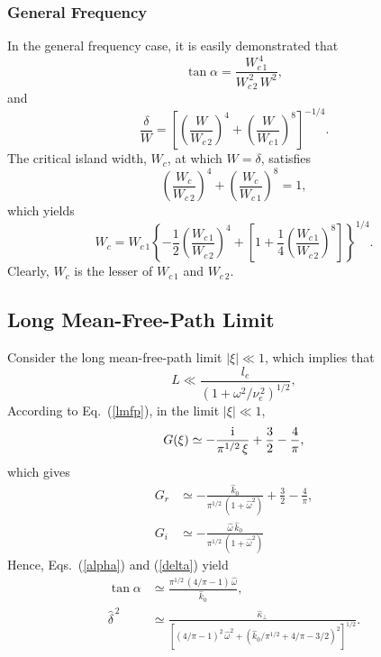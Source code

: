 \documentclass[12pt,prb,aps]{revtex4-1}
\begin{document}
\subsubsection{General Frequency}
In the general frequency case, it is easily demonstrated that
\begin{equation}
\tan\alpha  = \frac{W_{c\,1}^{\,4}}{W_{c\,2}^{\,2}\,W^2},
\end{equation}
and
\begin{equation}
\frac{\delta}{W} = \left[\left(\frac{W}{W_{c\,2}}\right)^4 + \left(\frac{W}{W_{c\,1}}\right)^8\right]^{-1/4}.
\end{equation}
The critical island width, $W_c$,  at which $W=\delta$, satisfies
\begin{equation}
\left(\frac{W_c}{W_{c\,2}}\right)^4 + \left(\frac{W_c}{W_{c\,1}}\right)^8= 1,
\end{equation}
which yields 
\begin{equation}
W_c= W_{c\,1}\left\{-\frac{1}{2}
\left(\frac{W_{c\,1}}{W_{c\,2}}\right)^4
+\left[1+\frac{1}{4}\left(\frac{W_{c\,1}}{W_{c\,2}}\right)^8\right]
\right\}^{1/4}.
\end{equation}
Clearly, $W_c$ is the lesser of $W_{c\,1}$ and $W_{c\,2}$. 

\subsection{Long Mean-Free-Path Limit}
Consider the long mean-free-path limit 
 $|\xi|\ll 1$, which implies that
\begin{equation}
L\ll \frac{l_e}{(1+\omega^2/\nu_e^{\,2})^{1/2}},
\end{equation}
According to Eq.~(\ref{lmfp}), in the limit $|\xi|\ll 1$, 
\begin{equation}
G(\xi) \simeq -\frac{{\rm i}}{\pi^{1/2}\,\xi} + \frac{3}{2}-\frac{4}{\pi},
\end{equation}
which gives
\begin{align}
G_r&\simeq -\frac{\hat{k}_0}{\pi^{1/2}\,(1+\hat{\omega}^2)}+\frac{3}{2}-\frac{4}{\pi},\\[0.5ex]
G_i &\simeq -\frac{\hat{\omega}\,\hat{k}_0}{\pi^{1/2}\,(1+\hat{\omega}^2)}
\end{align}
Hence, Eqs.~(\ref{alpha}) and (\ref{delta}) yield
\begin{align}\label{e135}
\tan\alpha&\simeq \frac{\pi^{1/2}\,(4/\pi-1)\,\hat{\omega}}{\hat{k}_0},\\[0.5ex]
\hat{\delta}^{\,2}&\simeq \frac{\hat{\kappa}_\perp}{[(4/\pi-1)^2\,\hat{\omega}^2 + (\hat{k}_0/\pi^{1/2}+4/\pi-3/2)^2]^{1/2}}.\label{e136}
\end{align}
\end{document}
